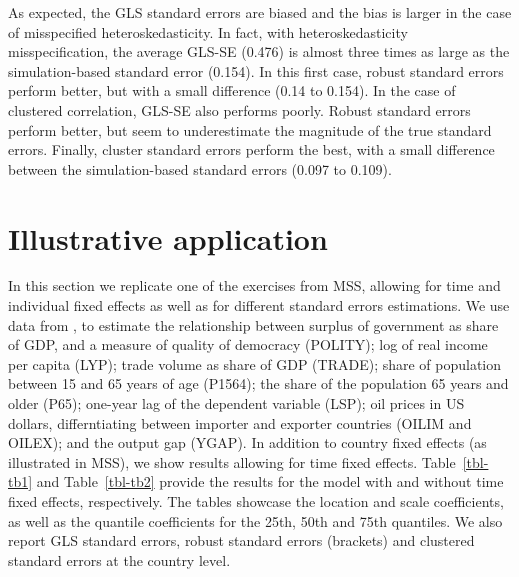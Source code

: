 \documentclass[
  authoryear,
  review,
  1p]{elsarticle}
\begin{document}
As expected, the GLS standard errors are biased and the bias is larger
in the case of misspecified heteroskedasticity. In fact, with
heteroskedasticity misspecification, the average GLS-SE (0.476) is
almost three times as large as the simulation-based standard error
(0.154). In this first case, robust standard errors perform better, but
with a small difference (0.14 to 0.154). In the case of clustered
correlation, GLS-SE also performs poorly. Robust standard errors perform
better, but seem to underestimate the magnitude of the true standard
errors. Finally, cluster standard errors perform the best, with a small
difference between the simulation-based standard errors (0.097 to
0.109).

\section{Illustrative application}\label{illustrative-application}

In this section we replicate one of the exercises from MSS, allowing for
time and individual fixed effects as well as for different standard
errors estimations. We use data from \citet{persson_economic_2005}, to
estimate the relationship between surplus of government as share of GDP,
and a measure of quality of democracy (POLITY); log of real income per
capita (LYP); trade volume as share of GDP (TRADE); share of population
between 15 and 65 years of age (P1564); the share of the population 65
years and older (P65); one-year lag of the dependent variable (LSP); oil
prices in US dollars, differntiating between importer and exporter
countries (OILIM and OILEX); and the output gap (YGAP). In addition to
country fixed effects (as illustrated in MSS), we show results allowing
for time fixed effects. Table~\ref{tbl-tb1} and Table~\ref{tbl-tb2}
provide the results for the model with and without time fixed effects,
respectively. The tables showcase the location and scale coefficients,
as well as the quantile coefficients for the 25th, 50th and 75th
quantiles. We also report GLS standard errors, robust standard errors
(brackets) and clustered standard errors at the country level.
\end{document}
